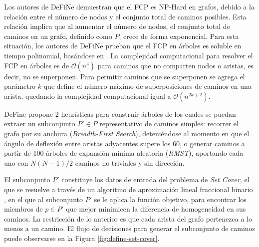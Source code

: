 Los autores de DeFiNe demuestran que el FCP es NP-Hard en grafos, debido a la relaci\'on entre el n\'umero de nodos y el conjunto total de caminos posibles. Esta relaci\'on implica que al aumentar el n\'umero de nodos, el conjunto total de caminos en un grafo, definido como $P$, crece de forma exponencial. Para esta situaci\'on, los autores de DeFiNe prueban que el FCP en \'arboles es soluble en tiempo polinomial, bas\'andose en \citet{lin2006vertex}. La complejidad computacional para resolver el FCP en \'arboles es de $\mathcal{O}(n^{4})$ para caminos que no comparten nodos o aristas, es decir, no se superponen. Para permitir caminos que se superponen se agrega el par\'ametro $k$ que define el n\'umero m\'aximo de superposiciones de caminos en una arista, quedando la complejidad computacional igual a $\mathcal{O}(n^{2k+2})$.


DeFine propone 2 heur\'isticas para construir \'arboles de los cuales se puedan extraer un subconjunto $P' \in P$ representativo de caminos simples: recorrer el grafo por su anchura ({\it Breadth-First Search}), deteni\'endose al momento en que el \'angulo de deflexi\'on entre aristas adyacentes supere los 60\degree, o generar caminos a partir de 100 \'arboles de expansi\'on m\'inima aleatoria ({\it RMST}), aportando cada uno con $N(N-1)/2$ caminos no triviales y sin direcci\'on. 


El subconjunto $P'$ constituye los datos de entrada del problema de {\it Set Cover}, el que se resuelve a trav\'es de un algoritmo de aproximaci\'on lineal fraccional binario , en el que al subconjunto $P'$ se le aplica la funci\'on objetivo, para encontrar los miembros de $p \in P'$ que mejor minimicen la diferencia de homogeneidad en sus caminos. La restricci\'on de lo anterior es que cada arista del grafo pertenezca a lo menos a un camino. El flujo de decisiones para generar el subconjunto de caminos puede observarse en la Figura \ref{fig:define-set-cover}.

